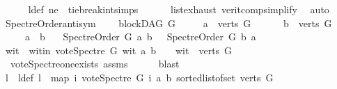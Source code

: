 \begin{isabellebody}
\ \ \ \ \isamarkupfalse%
\ l{\isacharunderscore}{\kern0pt}def\ ne\ \ tie{\isacharunderscore}{\kern0pt}break{\isacharunderscore}{\kern0pt}int{\isachardot}{\kern0pt}simps\isanewline
\ \ \ \ \ \ list{\isachardot}{\kern0pt}exhaust\ verit{\isacharunderscore}{\kern0pt}comp{\isacharunderscore}{\kern0pt}simplify{}{\isacharparenleft}{\kern0pt}{}{\isacharparenright}{\kern0pt}\ \isamarkupfalse%
\ auto\isanewline
{}\isamarkupfalse%
%
\endisatagproof
{\isafoldproof}%
%
\isadelimproof
\isanewline
%
\endisadelimproof
\isanewline
\isanewline
{}\isamarkupfalse%
\ Spectre{\isacharunderscore}{\kern0pt}Order{\isacharunderscore}{\kern0pt}antisym{\isacharcolon}{\kern0pt}\ \isanewline
\ \ \ {\isachardoublequoteopen}blockDAG\ G{\isachardoublequoteclose}\isanewline
\ \ \ \ \ {\isachardoublequoteopen}a\ {\isasymin}\ verts\ G{\isachardoublequoteclose}\ \isanewline
\ \ \ \ \ {\isachardoublequoteopen}b\ {\isasymin}\ verts\ G{\isachardoublequoteclose}\ \isanewline
\ \ \ \ \ {\isachardoublequoteopen}a\ {\isasymnoteq}\ b{\isachardoublequoteclose}\isanewline
\ \ \ {\isachardoublequoteopen}Spectre{\isacharunderscore}{\kern0pt}Order\ G\ a\ b\ {\isacharequal}{\kern0pt}\ {\isacharparenleft}{\kern0pt}{\isasymnot}\ {\isacharparenleft}{\kern0pt}Spectre{\isacharunderscore}{\kern0pt}Order\ G\ b\ a{\isacharparenright}{\kern0pt}{\isacharparenright}{\kern0pt}{\isachardoublequoteclose}\isanewline
%
\isadelimproof
%
\endisadelimproof
%
\isatagproof
{}\isamarkupfalse%
\ {\isacharminus}{\kern0pt}\isanewline
\ \ \isamarkupfalse%
\ wit\ \ wit{\isacharunderscore}{\kern0pt}in{\isacharcolon}{\kern0pt}\ {\isachardoublequoteopen}vote{\isacharunderscore}{\kern0pt}Spectre\ G\ wit\ a\ b\ {\isasymnoteq}\ {}\ {\isasymand}\ wit\ {\isasymin}\ verts\ G{\isachardoublequoteclose}\ \isanewline
\ \ \ \ \isamarkupfalse%
\ \ vote{\isacharunderscore}{\kern0pt}Spectre{\isacharunderscore}{\kern0pt}one{\isacharunderscore}{\kern0pt}exists\ assms\isanewline
\ \ \ \ \isamarkupfalse%
\ blast\ \isanewline
\ \ \isamarkupfalse%
\ l\ \ l{\isacharunderscore}{\kern0pt}def{\isacharcolon}{\kern0pt}\ {\isachardoublequoteopen}l\ {\isacharequal}{\kern0pt}\ {\isacharparenleft}{\kern0pt}map\ {\isacharparenleft}{\kern0pt}{\isasymlambda}i{\isachardot}{\kern0pt}\ vote{\isacharunderscore}{\kern0pt}Spectre\ G\ i\ a\ b{\isacharparenright}{\kern0pt}\ {\isacharparenleft}{\kern0pt}sorted{\isacharunderscore}{\kern0pt}list{\isacharunderscore}{\kern0pt}of{\isacharunderscore}{\kern0pt}set\ {\isacharparenleft}{\kern0pt}verts\ G{\isacharparenright}{\kern0pt}{\isacharparenright}{\kern0pt}{\isacharparenright}{\kern0pt}{\isachardoublequoteclose}\isanewline

\end{isabellebody}
